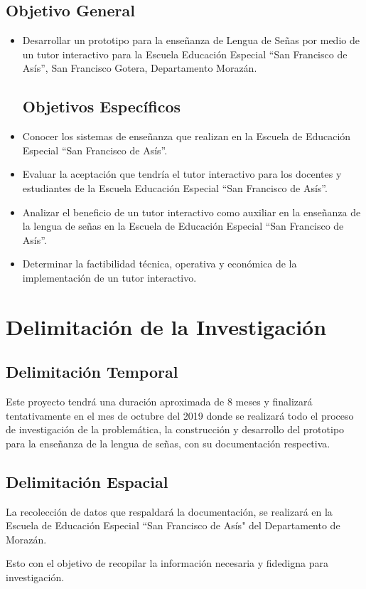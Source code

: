 \documentclass[12pt]{report}%
\begin{document}
\subsection{Objetivo General}
\begin{itemize}
\item Desarrollar un prototipo para la enseñanza de Lengua de Señas por medio de un tutor interactivo para la Escuela Educación Especial “San Francisco de Asís”, San Francisco Gotera, Departamento Morazán.
\subsection{Objetivos Específicos}
\item Conocer los sistemas de enseñanza que realizan en la Escuela de Educación Especial “San Francisco de Asís”.
\item Evaluar la aceptación que tendría el tutor interactivo para los docentes y estudiantes de la Escuela Educación Especial “San Francisco de Asís”. 
\item Analizar el beneficio de un tutor interactivo como auxiliar en la enseñanza de la lengua de señas en la Escuela de Educación Especial “San Francisco de Asís”. 
\item Determinar la factibilidad técnica, operativa y económica de la implementación de un tutor interactivo.
\end{itemize}

\newpage
\section{Delimitación de la Investigación}
\subsection{Delimitación Temporal}
Este proyecto tendrá una duración aproximada de 8 meses y finalizará tentativamente en el mes de octubre del 2019 donde se realizará todo el proceso de investigación de la problemática, la construcción y desarrollo del prototipo para la enseñanza de la lengua de señas, con su documentación respectiva.  
\subsection{Delimitación Espacial}
La recolección de datos que respaldará la documentación, se realizará en la Escuela de Educación Especial “San Francisco de Asís" del Departamento de Morazán.

Esto con el objetivo de recopilar la información necesaria y fidedigna para investigación.
\end{document}
